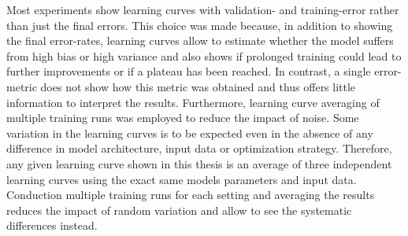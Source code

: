 Most experiments show learning curves with validation- and training-error rather than just the final errors. This choice was made because, in addition to showing the final error-rates, learning curves allow to estimate whether the model suffers from high bias or high variance and also shows if prolonged training could lead to further improvements or if a plateau has been reached. In contrast, a single error-metric does not show how this metric was obtained and thus offers little information to interpret the results. Furthermore, learning curve averaging of multiple training runs was employed to reduce the impact of noise. Some variation in the learning curves is to be expected even in the absence of any difference in model architecture, input data or optimization strategy. Therefore, any given learning curve shown in this thesis is an average of three independent learning curves using the exact same models parameters and input data. Conduction multiple training runs for each setting and averaging the results reduces the impact of random variation and allow to see the systematic differences instead. 


